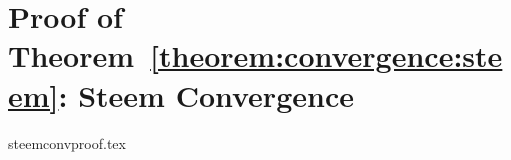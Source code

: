 \section{Proof of Theorem~\ref{theorem:convergence:steem}: Steem Convergence}
  \label{appendix:proof}
  {steemconvproof.tex}
